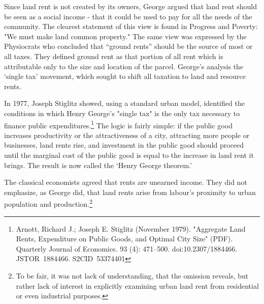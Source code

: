   Since land rent is not created by its owners, George argued that land rent should be seen as a social income - that it could be used to pay for all the needs of the community. The clearest statement of this view is found in Progress and Poverty: "We must make land common property." The same view was expressed by the Physiocrats who concluded  that ``ground rents'' should be the source of most or all taxes. They defined ground rent as that portion of all rent which is attributable only to the size and location of the parcel. George's analysis the `single tax' movement, which sought to shift all taxation to land  and resource rents.   
  
  In 1977, Joseph Stiglitz  showed, using a standard urban model, identified the conditions in which Henry George's "single tax" is  the only tax necessary to finance public expenditures.\footnote{Arnott, Richard J.; Joseph E. Stiglitz (November 1979). "Aggregate Land Rents, Expenditure on Public Goods, and Optimal City Size" (PDF). Quarterly Journal of Economics. 93 (4): 471–500. doi:10.2307/1884466. JSTOR 1884466. S2CID 53374401 }   The logic is fairly simple: if the public good increases productivity or the attractiveness of a city, attracting more people or businesses, land rents rise, and investment in the public good should proceed until the marginal cost of the public good is equal to the increase in land rent it brings. The result is now called the `Henry George theorem.'


The classical economists agreed that rents are unearned income. They did not emphasize, as George did, that land rents arise from labour's proximity to urban population and production.\footnote{To be fair, it was not lack of understanding, that the omission reveals, but rather lack of interest in explicitly examining urban land rent from residential or even industrial purposes.}%




